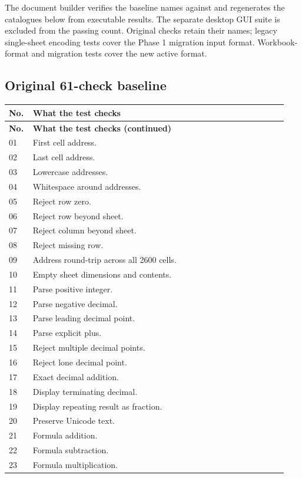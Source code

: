 \documentclass[11pt,letterpaper]{article}
\newcommand{\code}[1]{\texttt{\detokenize{#1}}}
\begin{document}
The document builder verifies the baseline names against \code{tests.json} and
regenerates the catalogues below from executable results. The separate desktop
GUI suite is excluded from the passing count. Original checks retain their names;
legacy single-sheet encoding tests cover the Phase 1 migration input format.
Workbook-format and migration tests cover the new active format.

\subsection{Original 61-check baseline}
\begin{longtable}{@{}P{0.07\linewidth}P{0.87\linewidth}@{}}
\toprule\textbf{No.} & \textbf{What the test checks}\\\midrule\endfirsthead
\toprule\textbf{No.} & \textbf{What the test checks (continued)}\\\midrule\endhead
01 & First cell address.\\
02 & Last cell address.\\
03 & Lowercase addresses.\\
04 & Whitespace around addresses.\\
05 & Reject row zero.\\
06 & Reject row beyond sheet.\\
07 & Reject column beyond sheet.\\
08 & Reject missing row.\\
09 & Address round-trip across all 2600 cells.\\
10 & Empty sheet dimensions and contents.\\
11 & Parse positive integer.\\
12 & Parse negative decimal.\\
13 & Parse leading decimal point.\\
14 & Parse explicit plus.\\
15 & Reject multiple decimal points.\\
16 & Reject lone decimal point.\\
17 & Exact decimal addition.\\
18 & Display terminating decimal.\\
19 & Display repeating result as fraction.\\
20 & Preserve Unicode text.\\
21 & Formula addition.\\
22 & Formula subtraction.\\
23 & Formula multiplication.\\

\end{longtable}
\end{document}
